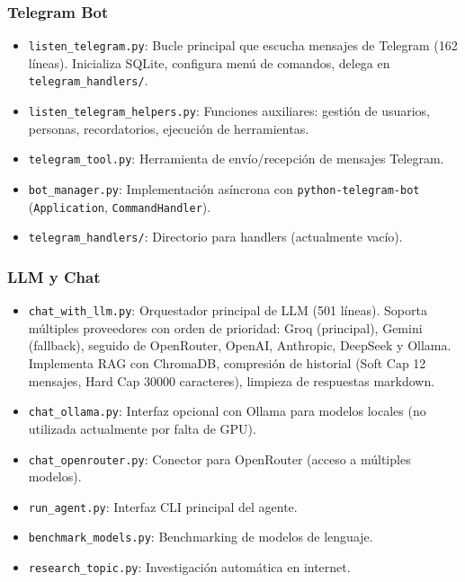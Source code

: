 \documentclass[12pt, a4paper]{article}
\begin{document}
\subsubsection*{Telegram Bot}
\begin{itemize}[leftmargin=*]
    \item \texttt{listen\_telegram.py}: Bucle principal que escucha mensajes de Telegram (162 líneas). Inicializa SQLite, configura menú de comandos, delega en \texttt{telegram\_handlers/}.
    \item \texttt{listen\_telegram\_helpers.py}: Funciones auxiliares: gestión de usuarios, personas, recordatorios, ejecución de herramientas.
    \item \texttt{telegram\_tool.py}: Herramienta de envío/recepción de mensajes Telegram.
    \item \texttt{bot\_manager.py}: Implementación asíncrona con \texttt{python-telegram-bot} (\texttt{Application}, \texttt{CommandHandler}).
    \item \texttt{telegram\_handlers/}: Directorio para handlers (actualmente vacío).
\end{itemize}

\subsubsection*{LLM y Chat}
\begin{itemize}[leftmargin=*]
    \item \texttt{chat\_with\_llm.py}: Orquestador principal de LLM (501 líneas). Soporta múltiples proveedores con orden de prioridad: Groq (principal), Gemini (fallback), seguido de OpenRouter, OpenAI, Anthropic, DeepSeek y Ollama. Implementa RAG con ChromaDB, compresión de historial (Soft Cap 12 mensajes, Hard Cap 30000 caracteres), limpieza de respuestas markdown.
    \item \texttt{chat\_ollama.py}: Interfaz opcional con Ollama para modelos locales (no utilizada actualmente por falta de GPU).
    \item \texttt{chat\_openrouter.py}: Conector para OpenRouter (acceso a múltiples modelos).
    \item \texttt{run\_agent.py}: Interfaz CLI principal del agente.
    \item \texttt{benchmark\_models.py}: Benchmarking de modelos de lenguaje.
    \item \texttt{research\_topic.py}: Investigación automática en internet.
\end{itemize}
\end{document}
